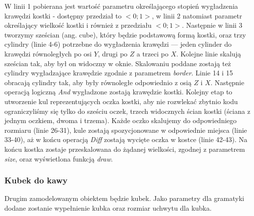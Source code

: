 W linii 1 pobierana jest wartość parametru określającego stopień wygładzenia
krawędzi kostki - dostępny przedział to $<0; 1>$, w linii 2 natomiast parametr
określający wielkość kostki i również z przedziału $<0; 1>$. Następnie w linii
3 tworzymy sześcian (ang. cube), który będzie podstawową formą kostki, oraz trzy
cylindry (linie 4-6) potrzebne do wygładzenia krawędzi --- jeden cylinder do
krawędzi równoległych po osi $Y$, drugi po $Z$ a trzeci po $X$. Kolejne linie
skalują sześcian tak, aby był on widoczny w oknie. Skalowaniu poddane zostają
też cylindry wygładzające krawędzie zgodnie z parametrem {\em border}. Linie 14
i 15 obracają cylindry tak, aby były równoległe odpowiednio z osią $Z$ i $X$.
Następnie operacją logiczną {\em And} wygładzone zostają krawędzie kostki. Kolejny etap to
utworzenie kul reprezentujących oczka kostki, aby nie rozwlekać zbytnio kodu ograniczyliśmy się
tylko do sześciu oczek, trzech widocznych ścian kostki (ściana z jednym
oczkiem, dwoma i trzema). Każde oczko skalujemy do odpowiedniego rozmiaru
(linie 26-31), kule zostają spozycjonowane w odpowiednie miejsca (linie 33-40),
aż w końcu operacją {\em Diff} zostają wycięte oczka w kostce (linie 42-43). Na
końcu kostka zostaje przeskalowana do żądanej wielkości, zgodnej z parametrem
{\em size}, oraz wyświetlona funkcją \emph{draw}.

\subsubsection{Kubek do kawy}
Drugim zamodelowanym obiektem będzie kubek. Jako parametry dla gramatyki dodane
zostanie wypełnienie kubka oraz rozmiar uchwytu dla kubka.

